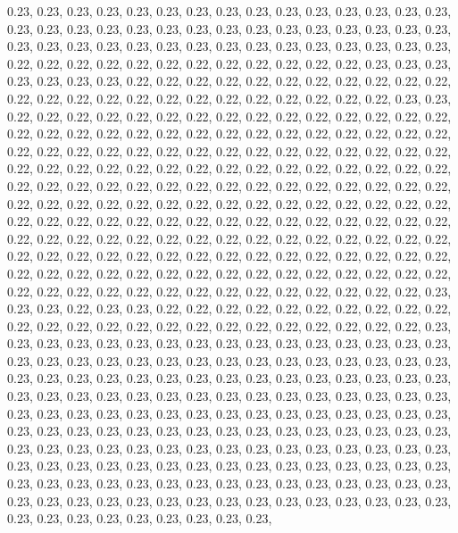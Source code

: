 \documentclass[11pt,]{article}
\begin{document}
0.23, 0.23, 0.23, 0.23, 0.23, 0.23, 0.23, 0.23, 0.23, 0.23, 0.23, 0.23,
0.23, 0.23, 0.23, 0.23, 0.23, 0.23, 0.23, 0.23, 0.23, 0.23, 0.23, 0.23,
0.23, 0.23, 0.23, 0.23, 0.23, 0.23, 0.23, 0.23, 0.23, 0.23, 0.23, 0.23,
0.23, 0.23, 0.23, 0.23, 0.23, 0.23, 0.23, 0.23, 0.23, 0.22, 0.22, 0.22,
0.22, 0.22, 0.22, 0.22, 0.22, 0.22, 0.22, 0.22, 0.22, 0.23, 0.23, 0.23,
0.23, 0.23, 0.23, 0.23, 0.22, 0.22, 0.22, 0.22, 0.22, 0.22, 0.22, 0.22,
0.22, 0.22, 0.22, 0.22, 0.22, 0.22, 0.22, 0.22, 0.22, 0.22, 0.22, 0.22,
0.22, 0.22, 0.22, 0.22, 0.23, 0.23, 0.22, 0.22, 0.22, 0.22, 0.22, 0.22,
0.22, 0.22, 0.22, 0.22, 0.22, 0.22, 0.22, 0.22, 0.22, 0.22, 0.22, 0.22,
0.22, 0.22, 0.22, 0.22, 0.22, 0.22, 0.22, 0.22, 0.22, 0.22, 0.22, 0.22,
0.22, 0.22, 0.22, 0.22, 0.22, 0.22, 0.22, 0.22, 0.22, 0.22, 0.22, 0.22,
0.22, 0.22, 0.22, 0.22, 0.22, 0.22, 0.22, 0.22, 0.22, 0.22, 0.22, 0.22,
0.22, 0.22, 0.22, 0.22, 0.22, 0.22, 0.22, 0.22, 0.22, 0.22, 0.22, 0.22,
0.22, 0.22, 0.22, 0.22, 0.22, 0.22, 0.22, 0.22, 0.22, 0.22, 0.22, 0.22,
0.22, 0.22, 0.22, 0.22, 0.22, 0.22, 0.22, 0.22, 0.22, 0.22, 0.22, 0.22,
0.22, 0.22, 0.22, 0.22, 0.22, 0.22, 0.22, 0.22, 0.22, 0.22, 0.22, 0.22,
0.22, 0.22, 0.22, 0.22, 0.22, 0.22, 0.22, 0.22, 0.22, 0.22, 0.22, 0.22,
0.22, 0.22, 0.22, 0.22, 0.22, 0.22, 0.22, 0.22, 0.22, 0.22, 0.22, 0.22,
0.22, 0.22, 0.22, 0.22, 0.22, 0.22, 0.22, 0.22, 0.22, 0.22, 0.22, 0.22,
0.22, 0.22, 0.22, 0.22, 0.22, 0.22, 0.22, 0.22, 0.22, 0.22, 0.22, 0.22,
0.22, 0.22, 0.22, 0.22, 0.22, 0.22, 0.22, 0.22, 0.22, 0.22, 0.22, 0.22,
0.22, 0.22, 0.23, 0.23, 0.23, 0.22, 0.23, 0.23, 0.22, 0.22, 0.22, 0.22,
0.22, 0.22, 0.22, 0.22, 0.22, 0.22, 0.22, 0.22, 0.22, 0.22, 0.22, 0.22,
0.22, 0.22, 0.22, 0.22, 0.22, 0.22, 0.22, 0.22, 0.23, 0.23, 0.23, 0.23,
0.23, 0.23, 0.23, 0.23, 0.23, 0.23, 0.23, 0.23, 0.23, 0.23, 0.23, 0.23,
0.23, 0.23, 0.23, 0.23, 0.23, 0.23, 0.23, 0.23, 0.23, 0.23, 0.23, 0.23,
0.23, 0.23, 0.23, 0.23, 0.23, 0.23, 0.23, 0.23, 0.23, 0.23, 0.23, 0.23,
0.23, 0.23, 0.23, 0.23, 0.23, 0.23, 0.23, 0.23, 0.23, 0.23, 0.23, 0.23,
0.23, 0.23, 0.23, 0.23, 0.23, 0.23, 0.23, 0.23, 0.23, 0.23, 0.23, 0.23,
0.23, 0.23, 0.23, 0.23, 0.23, 0.23, 0.23, 0.23, 0.23, 0.23, 0.23, 0.23,
0.23, 0.23, 0.23, 0.23, 0.23, 0.23, 0.23, 0.23, 0.23, 0.23, 0.23, 0.23,
0.23, 0.23, 0.23, 0.23, 0.23, 0.23, 0.23, 0.23, 0.23, 0.23, 0.23, 0.23,
0.23, 0.23, 0.23, 0.23, 0.23, 0.23, 0.23, 0.23, 0.23, 0.23, 0.23, 0.23,
0.23, 0.23, 0.23, 0.23, 0.23, 0.23, 0.23, 0.23, 0.23, 0.23, 0.23, 0.23,
0.23, 0.23, 0.23, 0.23, 0.23, 0.23, 0.23, 0.23, 0.23, 0.23, 0.23, 0.23,
0.23, 0.23, 0.23, 0.23, 0.23, 0.23, 0.23, 0.23, 0.23, 0.23, 0.23, 0.23,
0.23, 0.23, 0.23, 0.23, 0.23, 0.23, 0.23, 0.23, 0.23, 0.23, 0.23, 0.23,
\end{document}
